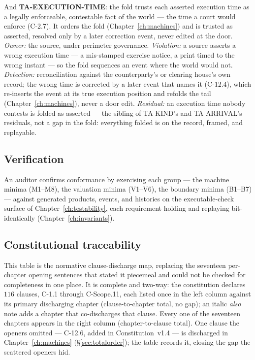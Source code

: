 \documentclass[11pt,a4paper]{article}
\begin{document}
And \textbf{TA-EXECUTION-TIME}: the fold trusts each asserted execution time as a legally
enforceable, contestable fact of the world --- the time a court would enforce (C-2.7). It
orders the fold (Chapter~\ref{ch:machines}) and is trusted as asserted, resolved only by a
later correction event, never edited at the door. \emph{Owner:} the source, under perimeter
governance. \emph{Violation:} a source asserts a wrong execution time --- a mis-stamped
exercise notice, a print timed to the wrong instant --- so the fold sequences an event where
the world would not. \emph{Detection:} reconciliation against the counterparty's or clearing
house's own record; the wrong time is corrected by a later event that names it (C-12.4), which
re-inserts the event at its true execution position and refolds the tail
(Chapter~\ref{ch:machines}), never a door edit. \emph{Residual:} an execution time nobody
contests is folded as asserted --- the sibling of TA-KIND's and TA-ARRIVAL's residuals, not a
gap in the fold: everything folded is on the record, framed, and replayable.

\subsection{Verification}

An auditor confirms conformance by exercising each group --- the machine minima (M1--M8), the
valuation minima (V1--V6), the boundary minima (B1--B7) --- against generated products, events,
and histories on the executable-check surface of Chapter~\ref{ch:testability}, each requirement
holding and replaying bit-identically (Chapter~\ref{ch:invariants}).

\subsection{Constitutional traceability}\label{sec:traceability}

This table is the normative clause-discharge map, replacing the seventeen per-chapter opening
sentences that stated it piecemeal and could not be checked for completeness in one place. It is
complete and two-way: the constitution declares $116$ clauses, C-1.1 through C-Scope.11, each
listed once in the left column against its primary discharging chapter (clause-to-chapter total,
no gap); an italic \emph{also} note adds a chapter that co-discharges that clause. Every one of
the seventeen chapters appears in the right column (chapter-to-clause total). One clause the openers omitted --- C-12.6, added in Constitution~v1.4 --- is discharged
in Chapter~\ref{ch:machines} (\S\ref{sec:totalorder}); the table records it, closing the gap the
scattered openers hid.
\end{document}
